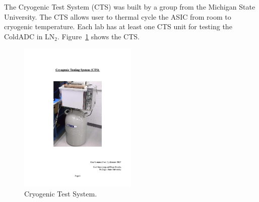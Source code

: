 \label{sec:2.1}


The Cryogenic Test System (CTS) was built by a group from the Michigan State University. The CTS allows user to thermal cycle the ASIC from room to cryogenic temperature. Each lab has at least one CTS unit for testing the ColdADC in LN$_2$. Figure~\ref{fig:cts} shows the CTS.
\begin{figure}[htb]
\centering
\begin{center}
\includegraphics[width=0.5\textwidth]{figures/CTS.pdf}
\end{center}
\caption{Cryogenic Test System.}
\label{fig:cts}
\end{figure}

